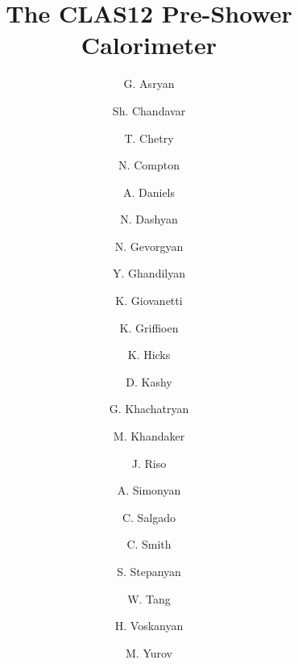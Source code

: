 \title{The CLAS12 Pre-Shower Calorimeter}

\author[YerPi]{G. Asryan}
\author[Ohio]{Sh. Chandavar}
\author[Ohio]{T. Chetry}
\author[Ohio]{N. Compton}
\author[Ohio]{A. Daniels}
\author[YerPi]{N. Dashyan}
\author[YerPi]{N. Gevorgyan}
\author[YerPi]{Y. Ghandilyan}
\author[JMU]{K. Giovanetti}
\author[WmM]{K. Griffioen}
\author[Ohio]{K. Hicks}
\author[JLAB] {D. Kashy}
\author[YerPi]{G. Khachatryan}
\author[NSU]{M. Khandaker}
\author[WmM]{J. Riso}
\author[YerPi]{A. Simonyan}
\author[NSU] {C. Salgado}
\author[UVA]{C. Smith}
\author[JLAB]{S. Stepanyan}
\author[Ohio]{W. Tang}
\author[YerPi]{H. Voskanyan}
\author[KPook] {M. Yurov}

\address[JLAB]{Thomas Jefferson National Accelerator Facility, 
Newport News, VA 23606, USA}
\address[WmM]{The College of William and Mary, Williamsburg, VA 23185, USA}
\address[Ohio]{Ohio University, Athens, OH 4570, USA} 
\address[NSU] {Norfolk State University, Norfolk, VA 23504, USA}
\address[UVA]{University of Virginia, Charlottesville, VA 22901, USA}
\address[YerPi]{A. Alikhanyan National Science Laboratory,  Yerevan, 375036, Armenia}
\address[JMU]{James Madison University, Harrisonburg, VA , USA}
\address[KPook]{Kyungpook National University, Korea}

